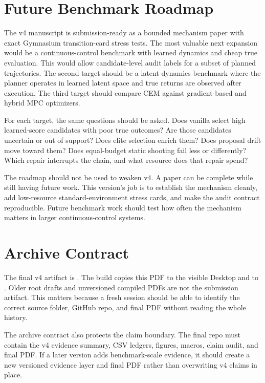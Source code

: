\section{Future Benchmark Roadmap}
\label{app:v4-roadmap}

The v4 manuscript is submission-ready as a bounded mechanism paper with exact
Gymnasium transition-card stress tests. The most valuable next expansion would
be a continuous-control benchmark with learned dynamics and cheap true
evaluation. This would allow candidate-level audit labels for a subset of
planned trajectories. The second target should be a latent-dynamics benchmark
where the planner operates in learned latent space and true returns are
observed after execution. The third target should compare CEM against
gradient-based and hybrid MPC optimizers.

For each target, the same questions should be asked. Does vanilla \cem{}
select high learned-score candidates with poor true outcomes? Are those
candidates uncertain or out of support? Does elite selection enrich them? Does
proposal drift move toward them? Does equal-budget static shooting fail less
or differently? Which repair interrupts the chain, and what resource does that
repair spend?

The roadmap should not be used to weaken v4. A paper can be complete while
still having future work. This version's job is to establish the mechanism
cleanly, add low-resource standard-environment stress cards, and make the audit
contract reproducible. Future benchmark work should test how often the
mechanism matters in larger continuous-control systems.

\section{Archive Contract}
\label{app:archive}

The final v4 artifact is
. The build copies this PDF
to the visible Desktop and to . Older root drafts and
unversioned compiled PDFs are not the submission artifact. This matters
because a fresh session should be able to identify the correct source folder,
GitHub repo, and final PDF without reading the whole history.

The archive contract also protects the claim boundary. The final repo must
contain the v4 evidence summary, CSV ledgers, figures, macros, claim audit, and
final PDF. If a later version adds benchmark-scale evidence, it should create
a new versioned evidence layer and final PDF rather than overwriting v4 claims
in place.

